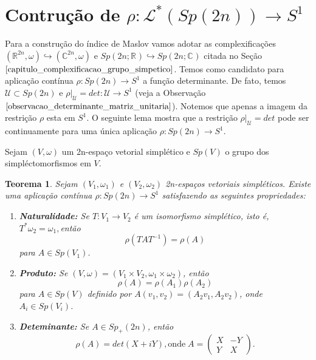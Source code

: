 \documentclass[12pt]{book}
\newtheorem{teorema}{Teorema}[section]
\newcommand{\caminhosNaoDegeneradosSp}{\mathcal{L}^{*}(\gruposimpletico{2n})}
\newcommand{\circulo}{S^{1}}
\newcommand{\complexo}[1]{\mathbb{C}^{#1}}
\newcommand{\gruposimpletico}[1]{Sp(#1)}
\newcommand{\gruposimpleticocomplexo}[1]{Sp(#1; \complexo{})}
\newcommand{\gruposimpleticoreal}[1]{Sp(#1;\reta)}
\newcommand{\gruposimpleticopositivo}[1]{Sp_{+}(#1)}
\newcommand{\matrizSimpleticaOrtogonal}{\mathcal{U}}
\newcommand{\real}[1]{\mathbb{R}^{#1}}
\newcommand{\reta}{\real{}}
\begin{document}
	\section{Contrução de $\rho: \caminhosNaoDegeneradosSp \to \circulo$}
		Para a construção do índice de Maslov vamos adotar as complexificações $(\real{2n}, \omega) \hookrightarrow (\complexo{2n}, \omega)$ e $\gruposimpleticoreal{2n} \hookrightarrow \gruposimpleticocomplexo{2n}$ citada no Seção $\ref{capitulo_complexificacao_grupo_simpetico}$. Temos como candidato para aplicação contínua $\rho: \gruposimpletico{2n} \to \circulo$ a função determinante. De fato, temos $\matrizSimpleticaOrtogonal \subset \gruposimpletico{2n}$ e $\rho|_{\matrizSimpleticaOrtogonal}=det:\matrizSimpleticaOrtogonal \to \circulo$ (veja a Observação $\ref{observacao_determinante_matriz_unitaria}$). Notemos que apenas a imagem da restrição $\rho$ esta em $\circulo$. O seguinte lema mostra que a restrição $\rho|_{\matrizSimpleticaOrtogonal} = det$ pode ser continuamente para uma única aplicação  $\rho: \gruposimpletico{2n} \to \circulo$.
		
		Sejam $(V, \omega)$ um 2n-espaço vetorial simplético e $\gruposimpletico{V}$ o grupo dos simpléctomorfismos em $V$. 
		\begin{teorema}
			Sejam $(V_{1}, \omega_{1})$ e $(V_{2}, \omega_{2})$ 2n-espaços vetoriais simpléticos. Existe uma aplicação contínua $\rho:Sp(2n) \to S^{1}$ satisfazendo as seguintes propriedades:
			\begin{enumerate}
				\item \textbf{Naturalidade:}  Se $T:V_{1} \to V_{2}$ é um isomorfismo simplético, isto é, $T^{*}\omega_{2} = \omega_{1}, $então 
				$$
					\rho(TAT^{-1}) = \rho(A)
				$$
				para $A\in \gruposimpletico{V_{1}}$.
				
				\item \textbf{Produto:} Se $(V,\omega) = (V_{1}\times V_{2},\omega_{1}\times \omega_{2})$, então
				$$
					\rho(A) = \rho(A_{1})\rho(A_{2})
				$$
				para $A\in \gruposimpletico{V}$ definido por $A(v_{1}, v_{2})=(A_{2}v_{1}, A_{2}v_{2})$, onde $A_{i} \in \gruposimpletico{V_{i}}$.
				
				\item \textbf{Deteminante:} Se $A\in \gruposimpleticopositivo{2n}$, então 
				$$
					\rho(A) = det(X+iY), \text{onde} \;	
					A=\left(
					\begin{array}{cc}
					X & -Y					\\
					Y & X
					\end{array}
					\right).
				$$
			\end{enumerate}
		\end{teorema}
		
\end{document}

